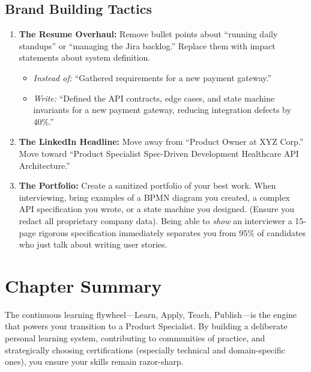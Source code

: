 \subsection{Brand Building Tactics}\label{brand-building-tactics}

\begin{enumerate}
\def\labelenumi{\arabic{enumi}.}
\tightlist
\item
  \textbf{The Resume Overhaul:} Remove bullet points about ``running
  daily standups'' or ``managing the Jira backlog.'' Replace them with
  impact statements about system definition.

  \begin{itemize}
  \tightlist
  \item
    \emph{Instead of:} ``Gathered requirements for a new payment
    gateway.''
  \item
    \emph{Write:} ``Defined the API contracts, edge cases, and state
    machine invariants for a new payment gateway, reducing integration
    defects by 40\%.''
  \end{itemize}
\item
  \textbf{The LinkedIn Headline:} Move away from ``Product Owner at XYZ
  Corp.'' Move toward ``Product Specialist \textbar{} Spec-Driven
  Development \textbar{} Healthcare API Architecture.''
\item
  \textbf{The Portfolio:} Create a sanitized portfolio of your best
  work. When interviewing, bring examples of a BPMN diagram you created,
  a complex API specification you wrote, or a state machine you
  designed. (Ensure you redact all proprietary company data). Being able
  to \emph{show} an interviewer a 15-page rigorous specification
  immediately separates you from 95\% of candidates who just talk about
  writing user stories.
\end{enumerate}

\bigskip

\section{Chapter Summary}\label{chapter-summary}

The continuous learning flywheel---Learn, Apply, Teach, Publish---is the
engine that powers your transition to a Product Specialist. By building
a deliberate personal learning system, contributing to communities of
practice, and strategically choosing certifications (especially
technical and domain-specific ones), you ensure your skills remain
razor-sharp.

